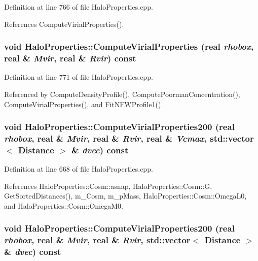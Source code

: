 Definition at line 766 of file HaloProperties.cpp.



References ComputeVirialProperties().

\subsubsection[{ComputeVirialProperties}]{\setlength{\rightskip}{0pt plus 5cm}void HaloProperties::ComputeVirialProperties ({\bf real} {\em rhobox}, \/  {\bf real} \& {\em Mvir}, \/  {\bf real} \& {\em Rvir}) const}\label{classHaloProperties_ad132159c56a38018afbe7c360803363c}


Definition at line 771 of file HaloProperties.cpp.



Referenced by ComputeDensityProfile(), ComputePoormanConcentration(), ComputeVirialProperties(), and FitNFWProfile1().

\subsubsection[{ComputeVirialProperties200}]{\setlength{\rightskip}{0pt plus 5cm}void HaloProperties::ComputeVirialProperties200 ({\bf real} {\em rhobox}, \/  {\bf real} \& {\em Mvir}, \/  {\bf real} \& {\em Rvir}, \/  {\bf real} \& {\em Vcmax}, \/  std::vector$<$ {\bf Distance} $>$ \& {\em dvec}) const}\label{classHaloProperties_a21c2e9833f9bec47f9c452cee9752996}


Definition at line 668 of file HaloProperties.cpp.



References HaloProperties::Cosm::asnap, HaloProperties::Cosm::G, GetSortedDistances(), m\_\-Cosm, m\_\-pMass, HaloProperties::Cosm::OmegaL0, and HaloProperties::Cosm::OmegaM0.

\subsubsection[{ComputeVirialProperties200}]{\setlength{\rightskip}{0pt plus 5cm}void HaloProperties::ComputeVirialProperties200 ({\bf real} {\em rhobox}, \/  {\bf real} \& {\em Mvir}, \/  {\bf real} \& {\em Rvir}, \/  std::vector$<$ {\bf Distance} $>$ \& {\em dvec}) const}\label{classHaloProperties_a473124bc8991382b9db3137448acfec9}


